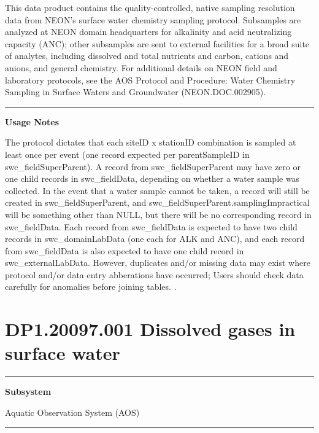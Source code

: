 \documentclass[]{article}
\begin{document}
This data product contains the quality-controlled, native sampling
resolution data from NEON's surface water chemistry sampling protocol.
Subsamples are analyzed at NEON domain headquarters for alkalinity and
acid neutralizing capacity (ANC); other subsamples are sent to external
facilities for a broad suite of analytes, including dissolved and total
nutrients and carbon, cations and anions, and general chemistry. For
additional details on NEON field and laboratory protocols, see the AOS
Protocol and Procedure: Water Chemistry Sampling in Surface Waters and
Groundwater (NEON.DOC.002905).

\begin{center}\rule{0.5\linewidth}{\linethickness}\end{center}

\textbf{Usage Notes}

The protocol dictates that each siteID x stationID combination is
sampled at least once per event (one record expected per parentSampleID
in swc\_fieldSuperParent). A record from swc\_fieldSuperParent may have
zero or one child records in swc\_fieldData, depending on whether a
water sample was collected. In the event that a water sample cannot be
taken, a record will still be created in swc\_fieldSuperParent, and
swc\_fieldSuperParent.samplingImpractical will be something other than
NULL, but there will be no corresponding record in swc\_fieldData. Each
record from swc\_fieldData is expected to have two child records in
swc\_domainLabData (one each for ALK and ANC), and each record from
swc\_fieldData is also expected to have one child record in
swc\_externalLabData. However, duplicates and/or missing data may exist
where protocol and/or data entry abberations have occurred; Users should
check data carefully for anomalies before joining tables. \newpage
.

\section{DP1.20097.001 Dissolved gases in surface
water}\label{dp1.20097.001-dissolved-gases-in-surface-water}

\begin{center}\rule{0.5\linewidth}{\linethickness}\end{center}

\textbf{Subsystem}

Aquatic Observation System (AOS)

\begin{center}\rule{0.5\linewidth}{\linethickness}\end{center}
\end{document}
